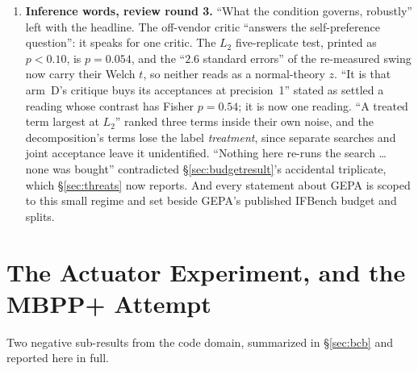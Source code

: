 \documentclass[11pt]{article}
\begin{document}
\begin{enumerate}
    replayable runs could have shown a move. The conclusion now says it would have flagged the
    untouched critique gene at the first affected run. The same pass corrected two replay
    sentences, ``replayed, their critique gene changed on two seeds in all'' in the abstract and
    ``on only two seeds anywhere in the pre-correction set'' in the conclusion: twelve of the
    fifteen runs replay, and the three BigCodeBench runs do not.
  \item \textbf{Inference words, review round 3.} ``What the condition governs, robustly'' left with
    the headline. The off-vendor critic ``answers the self-preference question'': it speaks for one
    critic. The $L_2$ five-replicate test, printed as $p<0.10$, is $p = 0.054$, and the
    ``$2.6$ standard errors'' of the re-measured swing now carry their Welch $t$, so neither reads
    as a normal-theory $z$. ``It is that arm~D's critique buys its acceptances at precision~1''
    stated as settled a reading whose contrast has Fisher $p = 0.54$; it is now one reading. ``A
    treated term largest at $L_2$'' ranked three terms inside their own noise, and the
    decomposition's terms lose the label \emph{treatment}, since separate searches and joint
    acceptance leave it unidentified. ``Nothing here re-runs the search \dots{} none was bought''
    contradicted \S\ref{sec:budgetresult}'s accidental triplicate, which \S\ref{sec:threats} now
    reports. And every statement about GEPA is scoped to this small regime and set beside GEPA's
    published IFBench budget and splits.
\end{enumerate}

\section{The Actuator Experiment, and the MBPP+ Attempt}
\label{sec:actuator}

Two negative sub-results from the code domain, summarized in \S\ref{sec:bcb} and reported
here in full.
\end{document}

